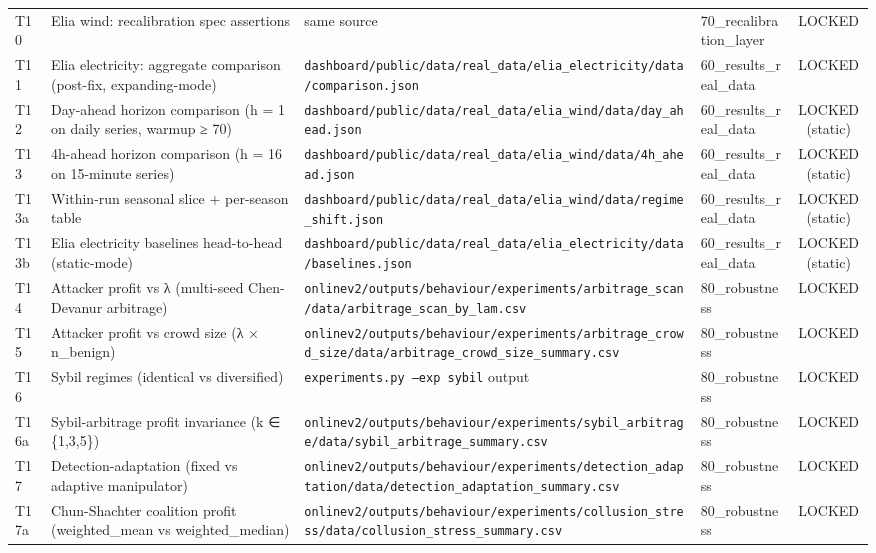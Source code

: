 \documentclass[11pt,a4paper,openany]{report}
\begin{document}
\begin{center}
\begin{tabular}{llllc}
T10 & Elia wind: recalibration spec assertions & same source & 70\_recalibration\_layer & LOCKED \\
T11 & Elia electricity: aggregate comparison (post-fix, expanding-mode) & \texttt{dashboard/public/data/real\_data/elia\_electricity/data/comparison.json} & 60\_results\_real\_data & LOCKED \\
T12 & Day-ahead horizon comparison (h = 1 on daily series, warmup ≥ 70) & \texttt{dashboard/public/data/real\_data/elia\_wind/data/day\_ahead.json} & 60\_results\_real\_data & LOCKED (static) \\
T13 & 4h-ahead horizon comparison (h = 16 on 15-minute series) & \texttt{dashboard/public/data/real\_data/elia\_wind/data/4h\_ahead.json} & 60\_results\_real\_data & LOCKED (static) \\
T13a & Within-run seasonal slice + per-season table & \texttt{dashboard/public/data/real\_data/elia\_wind/data/regime\_shift.json} & 60\_results\_real\_data & LOCKED (static) \\
T13b & Elia electricity baselines head-to-head (static-mode) & \texttt{dashboard/public/data/real\_data/elia\_electricity/data/baselines.json} & 60\_results\_real\_data & LOCKED (static) \\
T14 & Attacker profit vs λ (multi-seed Chen-Devanur arbitrage) & \texttt{onlinev2/outputs/behaviour/experiments/arbitrage\_scan/data/arbitrage\_scan\_by\_lam.csv} & 80\_robustness & LOCKED \\
T15 & Attacker profit vs crowd size (λ × n\_benign) & \texttt{onlinev2/outputs/behaviour/experiments/arbitrage\_crowd\_size/data/arbitrage\_crowd\_size\_summary.csv} & 80\_robustness & LOCKED \\
T16 & Sybil regimes (identical vs diversified) & \texttt{experiments.py --exp sybil} output & 80\_robustness & LOCKED \\
T16a & Sybil-arbitrage profit invariance (k ∈ \{1,3,5\}) & \texttt{onlinev2/outputs/behaviour/experiments/sybil\_arbitrage/data/sybil\_arbitrage\_summary.csv} & 80\_robustness & LOCKED \\
T17 & Detection-adaptation (fixed vs adaptive manipulator) & \texttt{onlinev2/outputs/behaviour/experiments/detection\_adaptation/data/detection\_adaptation\_summary.csv} & 80\_robustness & LOCKED \\
T17a & Chun-Shachter coalition profit (weighted\_mean vs weighted\_median) & \texttt{onlinev2/outputs/behaviour/experiments/collusion\_stress/data/collusion\_stress\_summary.csv} & 80\_robustness & LOCKED \\

\end{tabular}
\end{center}
\end{document}
